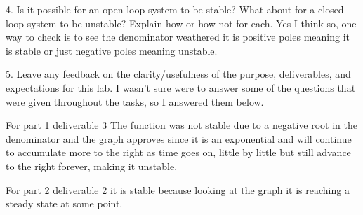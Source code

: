 \documentclass[12pt,a4paper]{article}
\begin{document}
4. Is it possible for an open-loop system to be stable? What about for a closed-loop system to
be unstable? Explain how or how not for each. \newline
\noindent Yes I think so, one way to check is to see the denominator weathered it is positive poles meaning it is stable or just negative poles meaning unstable. 

5. Leave any feedback on the clarity/usefulness of the purpose, deliverables, and expectations
for this lab. \newline
I wasn't sure were to answer some of the questions that were given throughout the tasks, so I answered them below.

For part 1 deliverable 3 The function was not stable due to a negative root in the denominator and the graph approves since it is an exponential and will continue to accumulate more to the right as time goes on, little by little but still advance to the right forever, making it unstable. 

For part 2 deliverable 2 it is stable because looking at the graph it is reaching a steady state at some point.


\end{document}
